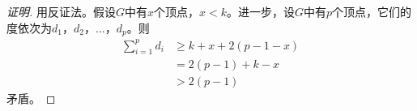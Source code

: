 \begin{proof}[证明]
  用反证法。假设$G$中有$x$个顶点，$x < k$。进一步，设$G$中有$p$个顶点，它们的度依次为$d_1$，$d_2$，$\ldots$，$d_p$。则
  \begin{equation*}
    \begin{split}
      \sum_{i=1}^pd_i &\geq k + x + 2(p-1-x)\\
      &= 2(p-1) + k - x\\
      &> 2(p-1)
    \end{split}
  \end{equation*}
  矛盾。
\end{proof}
